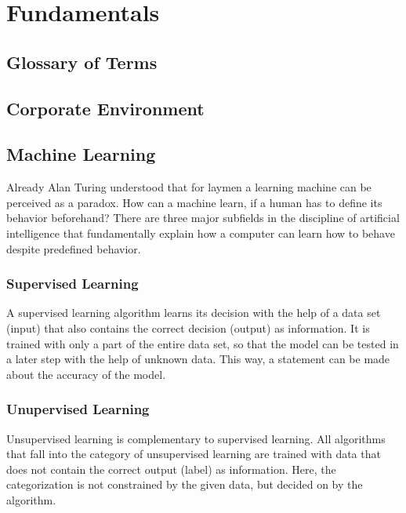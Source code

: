 \chapter{Fundamentals}
\section{Glossary of Terms}

\section{Corporate Environment}
\section{Machine Learning}
Already Alan Turing understood that for laymen a learning machine can be perceived as a paradox.  How can a machine learn, if a human has to define its behavior beforehand? There are three major subfields in the discipline of artificial intelligence that fundamentally explain how a computer can learn how to behave despite predefined behavior.

\subsection{Supervised Learning}
A supervised learning algorithm learns its decision with the help of a data set (input) that also contains the correct decision (output) as information. It is trained with only a part of the entire data set, so that the model can be tested in a later step with the help of unknown data. This way, a statement can be made about the accuracy of the model.

\subsection{Unupervised Learning}
Unsupervised learning is complementary to supervised learning. All algorithms that fall into the category of unsupervised learning are trained with data that does not contain the correct output (label) as information. Here, the categorization is not constrained by the given data, but decided on by the algorithm.

